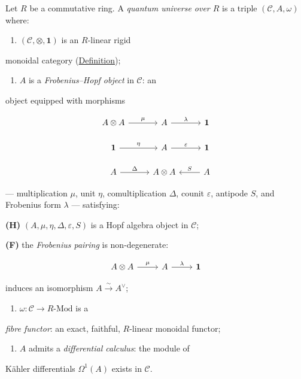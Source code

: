 \begin{definition}
  \label{def:quantum-universe}
Let $R$ be a commutative ring. A \emph{quantum universe over $R$} is a
triple $(\mathcal{C}, A, \omega)$ where:

\begin{enumerate}
  \item $(\mathcal{C}, \otimes, \mathbf{1})$ is an $R$-linear rigid
\end{enumerate}
   monoidal category
   (\hyperref[def:rigid-monoidal-category]{Definition});

\begin{enumerate}
  \item $A$ is a \emph{Frobenius--Hopf object} in $\mathcal{C}$: an
\end{enumerate}
   object equipped with morphisms

   \[
   \begin{tikzcd}[row sep=1.5em, column sep=2.5em]
     A \otimes A \ar[r, "\mu"] & A \ar[r, "\lambda"] & \mathbf{1}
     \\
     \mathbf{1} \ar[r, "\eta"] & A \ar[r, "\varepsilon"] & \mathbf{1}
     \\
     A \ar[r, "\Delta"] & A \otimes A
     & A \ar[l, "S"']
   \end{tikzcd}
   \]

   --- multiplication $\mu$, unit $\eta$, comultiplication $\Delta$,
   counit $\varepsilon$, antipode $S$, and Frobenius
   form $\lambda$ --- satisfying:

   \textbf{(H)} $(A, \mu, \eta, \Delta, \varepsilon, S)$ is
   a Hopf algebra object in $\mathcal{C}$;

   \textbf{(F)} the \emph{Frobenius pairing} is
   non-degenerate:

   \begin{equation}\label{eq:frobenius-pairing}
   \begin{tikzcd}[column sep=2.5em]
     A \otimes A \ar[r, "\mu"]
     & A \ar[r, "\lambda"]
     & \mathbf{1}
   \end{tikzcd}
   \end{equation}

   induces an isomorphism $A \xrightarrow{\;\sim\;} A^{\vee}$;

\begin{enumerate}
  \item $\omega \colon \mathcal{C} \to R\text{-}\mathrm{Mod}$ is a
\end{enumerate}
   \emph{fibre functor}: an exact, faithful, $R$-linear monoidal
   functor;

\begin{enumerate}
  \item $A$ admits a \emph{differential calculus}: the module of
\end{enumerate}
   K\"ahler differentials $\Omega^1(A)$ exists in $\mathcal{C}$.
\end{definition}

